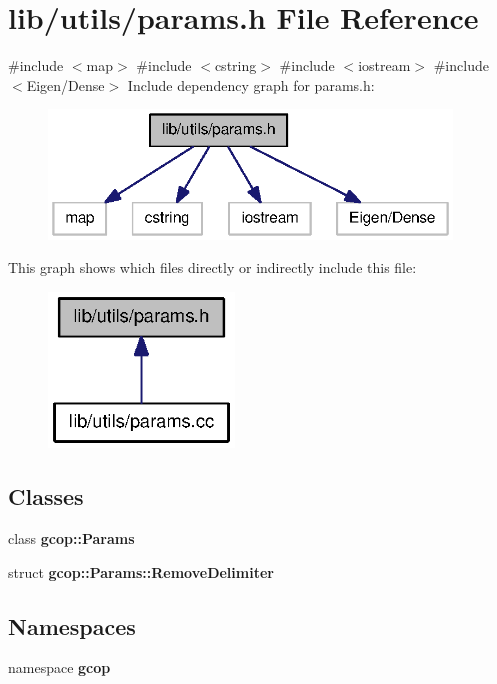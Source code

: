 \section{lib/utils/params.h \-File \-Reference}
\label{params_8h}
{\ttfamily \#include $<$map$>$}\*
{\ttfamily \#include $<$cstring$>$}\*
{\ttfamily \#include $<$iostream$>$}\*
{\ttfamily \#include $<$\-Eigen/\-Dense$>$}\*
\-Include dependency graph for params.\-h\-:\nopagebreak
\begin{figure}[H]
\begin{center}
\leavevmode
\includegraphics[width=304pt]{params_8h__incl}
\end{center}
\end{figure}
\-This graph shows which files directly or indirectly include this file\-:\nopagebreak
\begin{figure}[H]
\begin{center}
\leavevmode
\includegraphics[width=140pt]{params_8h__dep__incl}
\end{center}
\end{figure}
\subsection*{\-Classes}
\begin{DoxyCompactItemize}
\item 
class {\bf gcop\-::\-Params}
\item 
struct {\bf gcop\-::\-Params\-::\-Remove\-Delimiter}
\end{DoxyCompactItemize}
\subsection*{\-Namespaces}
\begin{DoxyCompactItemize}
\item 
namespace {\bf gcop}
\end{DoxyCompactItemize}
